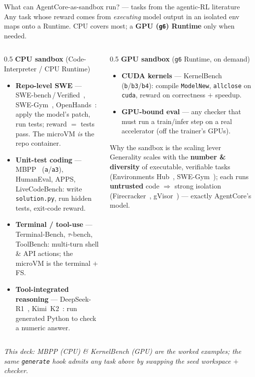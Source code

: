 \documentclass[aspectratio=169]{beamer}
\begin{document}
\begin{frame}{What can AgentCore-as-sandbox run? --- tasks from the agentic-RL literature}
  \footnotesize Any task whose reward comes from \emph{executing} model output in an isolated env maps
  onto a Runtime. CPU covers most; a \textbf{GPU (\texttt{g6}) Runtime} only when needed.
  \begin{columns}[T]
    \begin{column}{0.5\textwidth}
      \textbf{CPU sandbox} (Code-Interpreter / CPU Runtime)
      \begin{itemize}\scriptsize\setlength\itemsep{0.1em}
        \item \textbf{Repo-level SWE} --- SWE-bench\,/\,Verified~\cite{swebench}, SWE-Gym~\cite{swegym},
          OpenHands~\cite{openhands}: apply the model's patch, run tests; reward $=$ tests pass. The
          microVM \emph{is} the repo container.
        \item \textbf{Unit-test coding} --- MBPP~\cite{mbpp} (\texttt{a}/\texttt{a3}),
          HumanEval, APPS, LiveCodeBench: write \texttt{solution.py}, run hidden tests, exit-code reward.
        \item \textbf{Terminal / tool-use} --- Terminal-Bench, $\tau$-bench, ToolBench: multi-turn shell
          \& API actions; the microVM is the terminal $+$ FS.
        \item \textbf{Tool-integrated reasoning} --- DeepSeek-R1~\cite{deepseekr1}, Kimi~K2~\cite{kimik2}:
          run generated Python to check a numeric answer.
      \end{itemize}
    \end{column}
    \begin{column}{0.5\textwidth}
      \textbf{GPU sandbox} (\texttt{g6} Runtime, on demand)
      \begin{itemize}\scriptsize\setlength\itemsep{0.1em}
        \item \textbf{CUDA kernels} --- KernelBench~\cite{kernelbench}
          (\texttt{b}/\texttt{b3}/\texttt{b4}): compile \texttt{ModelNew}, \texttt{allclose}
          on \texttt{cuda}, reward on correctness $+$ speedup.
        \item \textbf{GPU-bound eval} --- any checker that must run a train/infer step on a real
          accelerator (off the trainer's GPUs).
      \end{itemize}
      \vspace{0.05em}
      \begin{block}{Why the sandbox is the scaling lever}
        \scriptsize Generality scales with the \textbf{number \& diversity} of executable, verifiable
        tasks (Environments Hub~\cite{envhub}, SWE-Gym~\cite{swegym}); each runs \textbf{untrusted}
        code $\Rightarrow$ strong isolation (Firecracker~\cite{firecracker}, gVisor~\cite{gvisor}) --- exactly AgentCore's model.
      \end{block}
    \end{column}
  \end{columns}
  {\scriptsize\itshape This deck: MBPP (CPU) \& KernelBench (GPU) are the worked examples; the same
  \texttt{generate} hook admits any task above by swapping the seed workspace $+$ checker.}
\end{frame}
\end{document}
